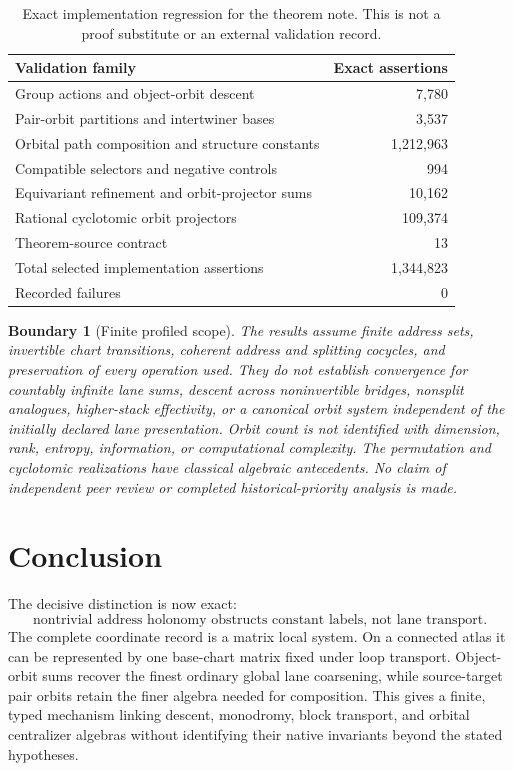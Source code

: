 \documentclass[11pt]{article}
\newtheorem{boundary}[theorem]{Boundary}
\begin{document}
\begin{table}[htbp]
\centering
\caption{Exact implementation regression for the theorem note.  This is not a proof substitute or an external validation record.}
\begin{tabular}{@{}lr@{}}
\toprule
Validation family & Exact assertions\\
\midrule
Group actions and object-orbit descent & 7,780\\
Pair-orbit partitions and intertwiner bases & 3,537\\
Orbital path composition and structure constants & 1,212,963\\
Compatible selectors and negative controls & 994\\
Equivariant refinement and orbit-projector sums & 10,162\\
Rational cyclotomic orbit projectors & 109,374\\
Theorem-source contract & 13\\
\midrule
Total selected implementation assertions & 1,344,823\\
Recorded failures & 0\\
\bottomrule
\end{tabular}
\end{table}

\begin{boundary}[Finite profiled scope]
The results assume finite address sets, invertible chart transitions, coherent address and splitting cocycles, and preservation of every operation used.  They do not establish convergence for countably infinite lane sums, descent across noninvertible bridges, nonsplit analogues, higher-stack effectivity, or a canonical orbit system independent of the initially declared lane presentation.  Orbit count is not identified with dimension, rank, entropy, information, or computational complexity.  The permutation and cyclotomic realizations have classical algebraic antecedents.  No claim of independent peer review or completed historical-priority analysis is made.
\end{boundary}

\section{Conclusion}

The decisive distinction is now exact:
\[
 \boxed{\text{nontrivial address holonomy obstructs constant labels, not lane transport.}}
\]
The complete coordinate record is a matrix local system.  On a connected atlas it can be represented by one base-chart matrix fixed under loop transport.  Object-orbit sums recover the finest ordinary global lane coarsening, while source-target pair orbits retain the finer algebra needed for composition.  This gives a finite, typed mechanism linking descent, monodromy, block transport, and orbital centralizer algebras without identifying their native invariants beyond the stated hypotheses.
\end{document}
